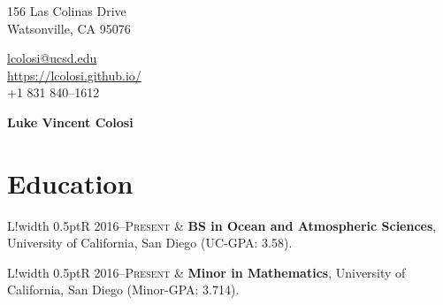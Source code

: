\documentclass[10pt]{article}
\newcommand\VRule{\color{lightgray}\vrule width 0.5pt}
\begin{document}
\pagestyle{empty}
\begin{minipage}[ht]{0.48\textwidth}
\begin{flushleft}
\small{156 Las Colinas Drive} \\
\small{Watsonville, CA 95076} \\
\end{flushleft}
\end{minipage}
\hfill
\begin{minipage}[ht]{0.48\textwidth}
\begin{flushright}
\noindent \href{mailto:lcolosi@ucsd.edu}{lcolosi@ucsd.edu} \ \ \ \ \ \ \ \ \ \ \ \ \ \ \ \ \ \ \ \   \\
{\url{https://lcolosi.github.io/} }\\
\small{+1 831 840--1612} \ \ \ \ \ \ \ \ \ \ \ \ \ \ \ \ \  \ \ \ \ \ \ \     \\
\end{flushright}
\end{minipage}


\vspace{.5cm}
\begin{center}
	{\bfseries\Huge Luke Vincent Colosi}
\end{center}
\vspace{.5cm}


\section*{Education}
\vspace{.3cm}
\begin{tabular}{L!{\VRule}R}
\textsc{2016--Present} & \textbf{BS in Ocean and Atmospheric Sciences}, University of California, San Diego (UC-GPA: 3.58). \\
\end{tabular}
\newline \noindent
\newline \noindent
\begin{tabular}{L!{\VRule}R}
\textsc{2016--Present} & \textbf{Minor in Mathematics}, University of California, San Diego (Minor-GPA: 3.714). \\
\end{tabular}


\end{document}
